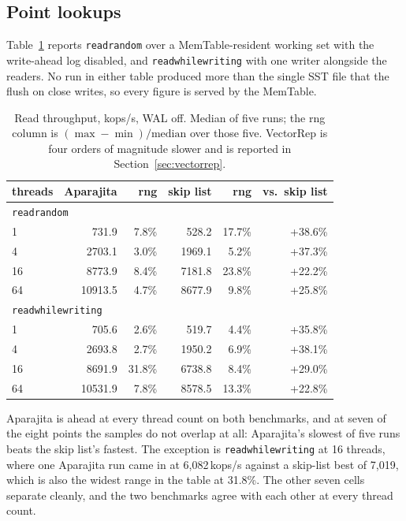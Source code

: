 \documentclass[conference]{IEEEtran}
\begin{document}
\subsection{Point lookups}

Table~\ref{tab:reads} reports \texttt{readrandom} over a MemTable-resident
working set with the write-ahead log disabled, and \texttt{readwhilewriting} with
one writer alongside the readers. No run in either table produced more than the
single SST file that the flush on close writes, so every figure is served by the
MemTable.

\begin{table}[t]
\caption{Read throughput, kops/s, WAL off. Median of five runs; the rng column is
         $(\max-\min)/\mathrm{median}$ over those five. VectorRep is four orders of
         magnitude slower and is reported in Section~\ref{sec:vectorrep}.}
\label{tab:reads}
\centering\footnotesize\setlength{\tabcolsep}{3pt}
\begin{tabular}{lrrrrr}
\toprule
threads & Aparajita & rng & skip list & rng & vs.\ skip list \\
\midrule
\multicolumn{6}{l}{\texttt{readrandom}} \\
1  &   731.9 &  7.8\% &  528.2 & 17.7\% & +38.6\% \\
4  &  2703.1 &  3.0\% & 1969.1 &  5.2\% & +37.3\% \\
16 &  8773.9 &  8.4\% & 7181.8 & 23.8\% & +22.2\% \\
64 & 10913.5 &  4.7\% & 8677.9 &  9.8\% & +25.8\% \\
\midrule
\multicolumn{6}{l}{\texttt{readwhilewriting}} \\
1  &   705.6 &  2.6\% &  519.7 &  4.4\% & +35.8\% \\
4  &  2693.8 &  2.7\% & 1950.2 &  6.9\% & +38.1\% \\
16 &  8691.9 & 31.8\% & 6738.8 &  8.4\% & +29.0\% \\
64 & 10531.9 &  7.8\% & 8578.5 & 13.3\% & +22.8\% \\
\bottomrule
\end{tabular}
\end{table}

Aparajita is ahead at every thread count on both benchmarks, and at seven of the
eight points the samples do not overlap at all: Aparajita's slowest of five runs
beats the skip list's fastest. The exception is \texttt{readwhilewriting} at 16
threads, where one Aparajita run came in at 6{,}082\,kops/s against a skip-list
best of 7{,}019, which is also the widest range in the table at 31.8\%. The other
seven cells separate cleanly, and the two benchmarks agree with each other at every
thread count.
\end{document}
